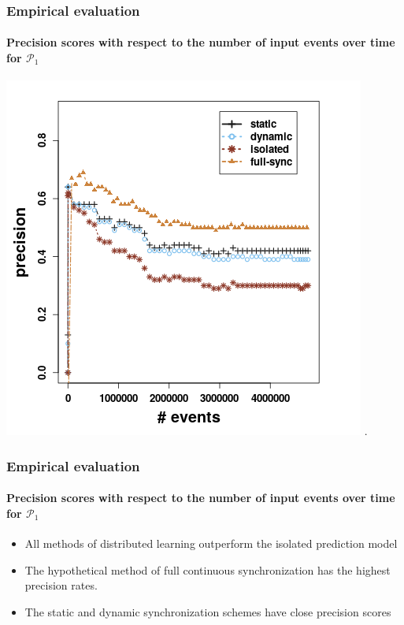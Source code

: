 \begin{frame}
	
	\frametitle{Empirical evaluation }
	\framesubtitle{Precision scores with respect to the number of input events over time for $\mathcal{P}_1$}
	
	\begin{center}
		\includegraphics[width=.8\textwidth,height=.7\linewidth]{figures/precision_p1.png}
		.
	\end{center}
	
\end{frame}

\begin{frame}
	
	\frametitle{Empirical evaluation }
	\framesubtitle{Precision scores with respect to the number of input events over time for $\mathcal{P}_1$}
	
	\begin{itemize}
		\item<1-> All methods of distributed learning outperform the isolated prediction model
		
		\item<1->  The hypothetical method of full continuous synchronization has the highest precision rates.
		\item<1-> The static and dynamic synchronization schemes have close precision scores
		
	\end{itemize}
	
\end{frame}




